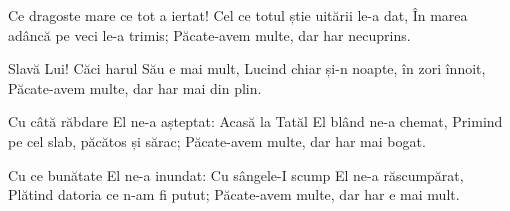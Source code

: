 \beginverse
Ce dragoste mare ce tot a iertat!
Cel ce totul știe uitării le-a dat,
În marea adâncă pe veci le-a trimis;
Păcate-avem multe, dar har necuprins.
\endverse

\beginchorus
Slavă Lui! Căci harul Său e mai mult,
Lucind chiar și-n noapte, în zori înnoit,
Păcate-avem multe, dar har mai din plin.
\endchorus

\beginverse
Cu câtă răbdare El ne-a așteptat:
Acasă la Tatăl El blând ne-a chemat,
Primind pe cel slab, păcătos și sărac;
Păcate-avem multe, dar har mai bogat.
\endverse

\beginverse
Cu ce bunătate El ne-a inundat:
Cu sângele-I scump El ne-a răscumpărat,
Plătind datoria ce n-am fi putut;
Păcate-avem multe, dar har e mai mult.
\endverse
\endsong
